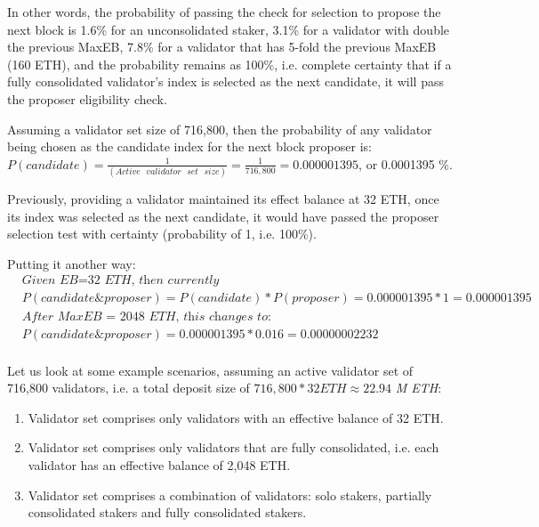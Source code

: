 In other words, the probability of passing the check for selection to propose the next block is 1.6\% for an unconsolidated staker, 3.1\% for a validator with double the previous MaxEB, 7.8\% for a validator that has 5-fold the previous MaxEB (160 ETH), and the probability remains as 100\%, i.e. complete certainty that if a fully consolidated validator's index is selected as the next candidate, it will pass the proposer eligibility check.

Assuming a validator set size of 716,800, then
the probability of any validator being chosen as the candidate index for the next block proposer is: \\
$P(candidate) = \frac{1}{(Active \texttt{ } validator \texttt{ } set \texttt{ } size)} = \frac{1}{ 716,800} = 0.000001395$, or 0.0001395 \%. 

Previously, providing a validator maintained its effect balance at 32 ETH, once its index was selected as the next candidate, it would have passed the proposer selection test with certainty (probability of 1, i.e. 100\%).

Putting it another way:
\begin{equation*}
\begin{split}
& \textit{Given EB=32 ETH, then currently } \\
& P(candidate \& proposer) = P(candidate) * P(proposer) = 0.000001395 * 1 = 0.000001395 \\
& \textit{After MaxEB = 2048 ETH, this changes to:} \\
& P(candidate \& proposer) = 0.000001395 * 0.016 = 0.00000002232 \\
\end{split}
\end{equation*}

Let us look at some example scenarios, assuming an active validator set of 716,800 validators, i.e. a total deposit size of $716,800 * 32 ETH \approx 22.94$ \textit{M ETH}:
\begin{enumerate}
\item Validator set comprises only validators with an effective balance of 32 ETH.
\item Validator set comprises only validators that are fully consolidated, i.e. each validator has an effective balance of 2,048 ETH.
\item Validator set comprises a combination of validators: solo stakers, partially consolidated stakers and fully consolidated stakers.
\end{enumerate}

